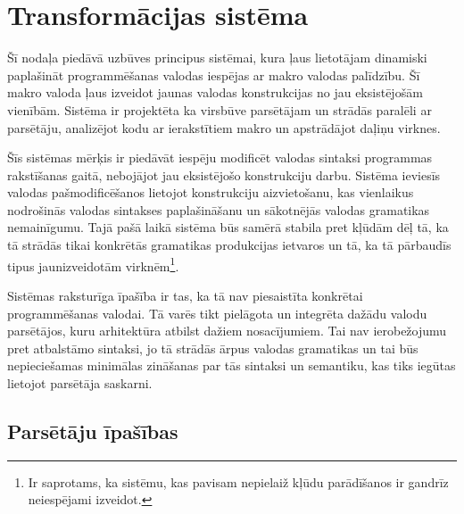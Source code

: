 \section{Transformācijas sistēma}
\label{s:system}

Šī nodaļa piedāvā uzbūves principus sistēmai, kura ļaus lietotājam dinamiski paplašināt programmēšanas valodas iespējas ar makro valodas palīdzību. Šī makro valoda ļaus izveidot jaunas valodas konstrukcijas no jau eksistējošām vienībām. Sistēma ir projektēta ka virsbūve parsētājam un strādās paralēli ar parsētāju, analizējot kodu ar ierakstītiem makro un apstrādājot daļiņu virknes.

Šīs sistēmas mērķis ir piedāvāt iespēju modificēt valodas sintaksi programmas rakstīšanas gaitā, nebojājot jau eksistējošo konstrukciju darbu. Sistēma ieviesīs valodas pašmodificēšanos lietojot konstrukciju aizvietošanu, kas vienlaikus nodrošinās valodas sintakses paplašināšanu un sākotnējās valodas gramatikas nemainīgumu. Tajā pašā laikā sistēma būs samērā stabila pret kļūdām dēļ tā, ka tā strādās tikai konkrētās gramatikas produkcijas ietvaros un tā, ka tā pārbaudīs tipus jaunizveidotām virknēm\footnote{Ir saprotams, ka sistēmu, kas pavisam nepielaiž kļūdu parādīšanos ir gandrīz neiespējami izveidot.}.

Sistēmas raksturīga īpašība ir tas, ka tā nav piesaistīta konkrētai programmēšanas valodai. Tā varēs tikt pielāgota un integrēta dažādu valodu parsētājos, kuru arhitektūra atbilst dažiem nosacījumiem. Tai nav ierobežojumu pret atbalstāmo sintaksi, jo tā strādās ārpus valodas gramatikas un tai būs nepieciešamas minimālas zināšanas par tās sintaksi un semantiku, kas tiks iegūtas lietojot parsētāja saskarni.


\subsection{\label{sbs:sys_parserqualities}Parsētāju īpašības}

